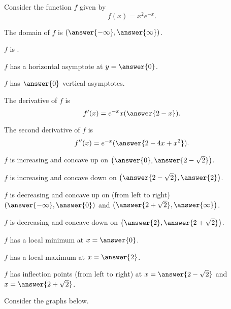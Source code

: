 \documentclass{ximera}
\author{Nela Lakos \and Kyle Parsons}
\begin{document}
\begin{exercise}

Consider the function $f$ given by 
\[
f(x) = x^2e^{-x}.
\]

The domain of $f$ is $\left(\answer{-\infty},\answer{\infty}\right)$.

$f$ is .

$f$ has a horizontal asymptote at $y=\answer{0}$.

$f$ has $\answer{0}$ vertical asymptotes.

The derivative of $f$ is
\[
f'(x) = e^{-x}x(\answer{2-x}).
\]

The second derivative of $f$ is
\[
f''(x) =e^{-x}( \answer{2-4x+x^2}).
\]

$f$ is increasing and concave up on $\left(\answer{0},\answer{2-\sqrt{2}}\right)$.

$f$ is increasing and concave down on $\left(\answer{2-\sqrt{2}},\answer{2}\right)$.

$f$ is decreasing and concave up on (from left to right) $\left(\answer{-\infty},\answer{0}\right)$ and $\left(\answer{2+\sqrt{2}},\answer{\infty}\right)$.

$f$ is decreasing and concave down on $\left(\answer{2},\answer{2+\sqrt{2}}\right)$.

$f$ has a local minimum at $x=\answer{0}$.

$f$ has a local maximum at $x=\answer{2}$.

$f$ has inflection points (from left to right) at $x=\answer{2-\sqrt{2}}$ and $x=\answer{2+\sqrt{2}}$.

Consider the graphs below.

\end{exercise}
\end{document}
